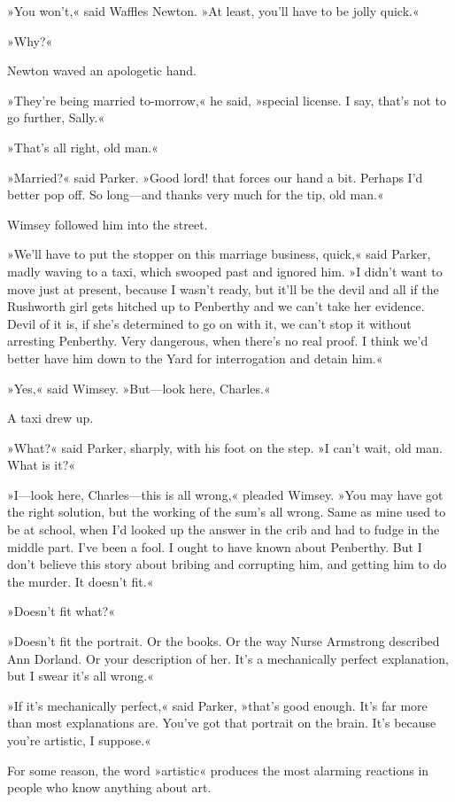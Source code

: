 »You won't,« said Waffles Newton. »At least, you'll have to be jolly quick.«

»Why?«

Newton waved an apologetic hand.

»They're being married to-morrow,« he said, »special license. I say, that's not to go further, Sally.«

»That's all right, old man.«

»Married?« said Parker. »Good lord! that forces our hand a bit. Perhaps I'd better pop off. So long—and thanks very much for the tip, old man.«

Wimsey followed him into the street.

»We'll have to put the stopper on this marriage business, quick,« said Parker, madly waving to a taxi, which swooped past and ignored him. »I didn't want to move just at present, because I wasn't ready, but it'll be the devil and all if the Rushworth girl gets hitched up to Penberthy and we can't take her evidence. Devil of it is, if she's determined to go on with it, we can't stop it without arresting Penberthy. Very dangerous, when there's no real proof. I think we'd better have him down to the Yard for interrogation and detain him.«

»Yes,« said Wimsey. »But—look here, Charles.«

A taxi drew up.

»What?« said Parker, sharply, with his foot on the step. »I can't wait, old man. What is it?«

»I—look here, Charles—this is all wrong,« pleaded Wimsey. »You may have got the right solution, but the working of the sum's all wrong. Same as mine used to be at school, when I'd looked up the answer in the crib and had to fudge in the middle part. I've been a fool. I ought to have known about Penberthy. But I don't believe this story about bribing and corrupting him, and getting him to do the murder. It doesn't fit.«

»Doesn't fit what?«

»Doesn't fit the portrait. Or the books. Or the way Nurse Armstrong described Ann Dorland. Or your description of her. It's a mechanically perfect explanation, but I swear it's all wrong.«

»If it's mechanically perfect,« said Parker, »that's good enough. It's far more than most explanations are. You've got that portrait on the brain. It's because you're artistic, I suppose.«

For some reason, the word »artistic« produces the most alarming reactions in people who know anything about art.


